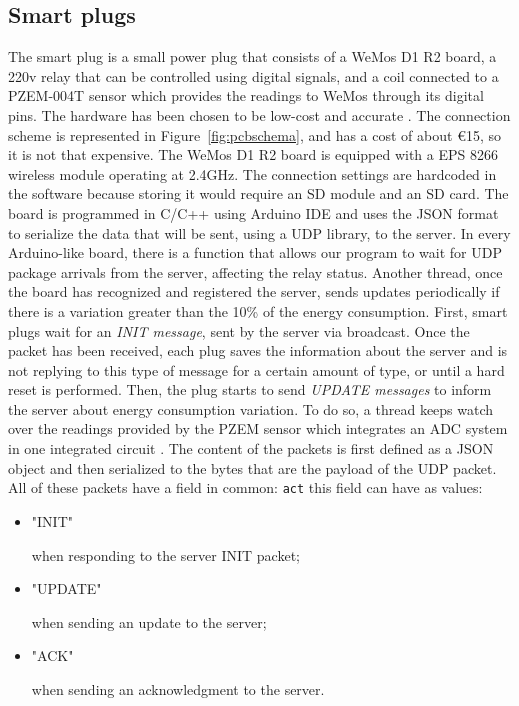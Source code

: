 \documentclass[conference]{IEEEtran}
\begin{document}
	\subsection{Smart plugs}\label{SP}
	The smart plug is a small power plug that consists of a WeMos D1 R2 board, a 220v relay that can be controlled using digital signals, and a coil connected to a PZEM-004T sensor \cite{8442052} \cite{8250475}  which provides the readings to WeMos through its digital pins. The hardware has been chosen to be low-cost and accurate \cite{8442066}.
	The connection scheme is represented in Figure~\ref{fig:pcbschema}, and has a cost of about €15, so it is not that expensive. 
	The WeMos D1 R2 board is equipped with a EPS 8266 wireless module operating at 2.4GHz. The connection settings are hardcoded in the software because storing it would require an SD module and an SD card. The board is programmed in C/C++ using Arduino IDE and uses the JSON format to serialize the data that will be sent, using a UDP library, to the server.
	In every Arduino-like board, there is a function that allows our program to wait for UDP package arrivals from the server, affecting the relay status.
	Another thread, once the board has recognized and registered the server, sends updates periodically if there is a variation greater than the 10\% of the energy consumption.
	First, smart plugs wait for an \textit{INIT message}, sent by the server via broadcast. Once the packet has been received, each plug saves the information about the server and is not replying to this type of message for a certain amount of type, or until a hard reset is performed. 
	Then, the plug starts to send \textit{UPDATE messages} to inform the server about energy consumption variation. To do so, a thread keeps watch over the readings provided by the PZEM sensor which integrates an ADC  system  in one integrated circuit \cite{8612412}.
	The content of the packets is first defined as a JSON object and then serialized to the bytes that are the payload of the UDP packet. All of these packets have a field in common: \verb|act| this field can have as values:
	\begin{itemize}
		\item \begin{spverbatim}"INIT"\end{spverbatim} when responding to the server INIT packet;
		\item \begin{spverbatim}"UPDATE"\end{spverbatim} when sending an update to the server;
		\item \begin{spverbatim}"ACK"\end{spverbatim} when sending an acknowledgment to the server.
	\end{itemize}
\end{document}
